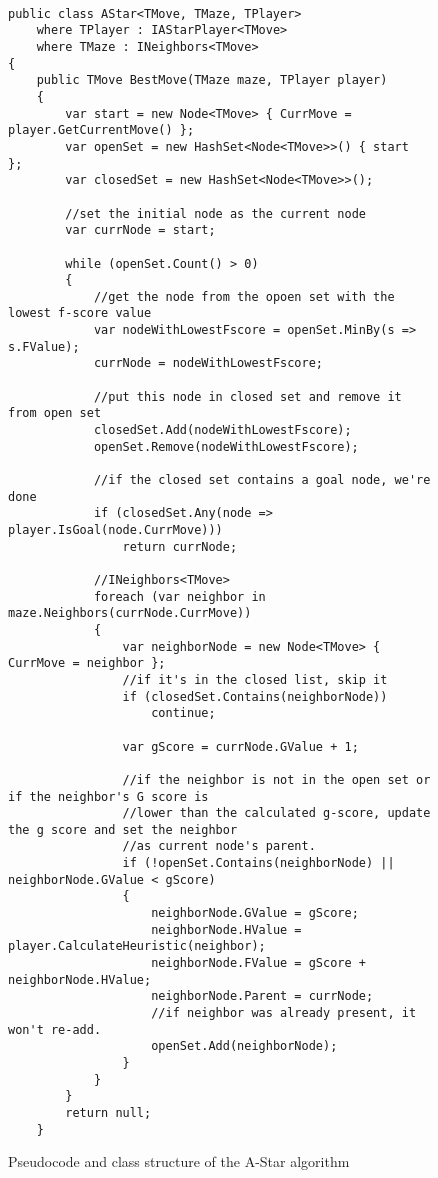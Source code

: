 \begin{figure}[h]
\captionsetup{justification=centering}
\begin{lstlisting}

public class AStar<TMove, TMaze, TPlayer>
    where TPlayer : IAStarPlayer<TMove>
    where TMaze : INeighbors<TMove>
{
    public TMove BestMove(TMaze maze, TPlayer player)
    {
        var start = new Node<TMove> { CurrMove = player.GetCurrentMove() };
        var openSet = new HashSet<Node<TMove>>() { start  };
        var closedSet = new HashSet<Node<TMove>>();

        //set the initial node as the current node
        var currNode = start;

        while (openSet.Count() > 0)
        {
            //get the node from the opoen set with the lowest f-score value
            var nodeWithLowestFscore = openSet.MinBy(s => s.FValue);
            currNode = nodeWithLowestFscore;

            //put this node in closed set and remove it from open set
            closedSet.Add(nodeWithLowestFscore);
            openSet.Remove(nodeWithLowestFscore);

            //if the closed set contains a goal node, we're done
            if (closedSet.Any(node => player.IsGoal(node.CurrMove)))
                return currNode;

            //INeighbors<TMove>
            foreach (var neighbor in maze.Neighbors(currNode.CurrMove))
            {
                var neighborNode = new Node<TMove> { CurrMove = neighbor };
                //if it's in the closed list, skip it
                if (closedSet.Contains(neighborNode))
                    continue;

                var gScore = currNode.GValue + 1;

                //if the neighbor is not in the open set or if the neighbor's G score is
                //lower than the calculated g-score, update the g score and set the neighbor
                //as current node's parent.
                if (!openSet.Contains(neighborNode) || neighborNode.GValue < gScore)
                {
                    neighborNode.GValue = gScore;
                    neighborNode.HValue = player.CalculateHeuristic(neighbor);
                    neighborNode.FValue = gScore + neighborNode.HValue;
                    neighborNode.Parent = currNode;
                    //if neighbor was already present, it won't re-add.
                    openSet.Add(neighborNode);
                }
            }
        }
        return null;
    }

\end{lstlisting}
\caption{Pseudocode and class structure of the A-Star algorithm}
\label{fig:minimaxABPruning}
\end{figure}